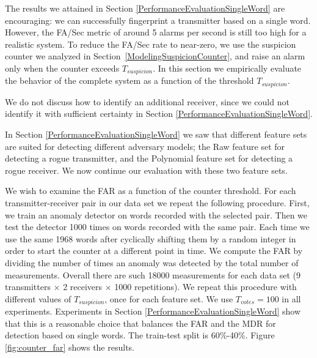 \documentclass[english]{llncs}
\begin{document}
  The results we attained in Section \ref{PerformanceEvaluationSingleWord} are encouraging: we can successfully fingerprint a transmitter based on a single word. However, the FA/Sec metric of around 5 alarms per second is still too high for a realistic system. To reduce the FA/Sec rate to near-zero, we use the suspicion counter we analyzed in Section~\ref{ModelingSuspicionCounter}, and raise an alarm only when the counter exceeds $T_{suspicion}$. In this section we empirically evaluate the behavior of the complete system as a function of the threshold $T_{suspicion}$.
  
  We do not discuss how to identify an additional receiver, since we could not identify it with sufficient certainty in Section \ref{PerformanceEvaluationSingleWord}.
  
  In Section \ref{PerformanceEvaluationSingleWord} we saw that different feature sets are suited for detecting different adversary models; the Raw feature set for detecting a rogue transmitter, and the Polynomial feature set for detecting a rogue receiver. We now continue our evaluation with these two feature sets.
  
  We wish to examine the FAR as a function of the counter threshold. For each transmitter-receiver pair in our data set we repeat the following procedure. First, we train an anomaly detector on words recorded with the selected pair. Then we test the detector 1000 times on words recorded with the same pair. Each time we use the same 1968 words after cyclically shifting them by a random integer in order to start the counter at a different point in time. We compute the FAR by dividing the number of times an anomaly was detected by the total number of measurements. Overall there are such 18000 measurements for each data set (9 transmitters $\times$ 2 receivers $\times$ 1000 repetitions).
  We repeat this procedure with different values of $T_{suspicion}$, once for each feature set. We use $T_{votes} = 100$ in all experiments. Experiments in Section \ref{PerformanceEvaluationSingleWord} show that this is a reasonable choice that balances the FAR and the MDR for detection based on single words. The train-test split is 60\%-40\%. Figure \ref{fig:counter_far} shows the results.
  
\end{document}
